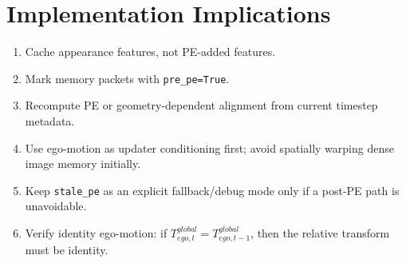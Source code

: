 \documentclass[11pt]{article}
\begin{document}
\section{Implementation Implications}

\begin{enumerate}[noitemsep]
  \item Cache appearance features, not PE-added features.
  \item Mark memory packets with \texttt{pre\_pe=True}.
  \item Recompute PE or geometry-dependent alignment from current timestep metadata.
  \item Use ego-motion as updater conditioning first; avoid spatially warping dense image memory initially.
  \item Keep \texttt{stale\_pe} as an explicit fallback/debug mode only if a post-PE path is unavoidable.
  \item Verify identity ego-motion: if \(T^{global}_{ego,t} = T^{global}_{ego,t-1}\), then the relative transform must be identity.
\end{enumerate}
\end{document}
